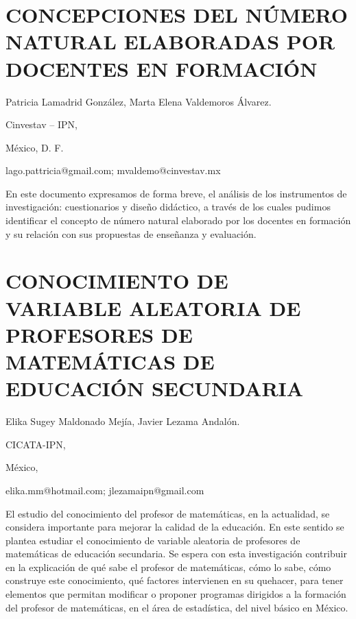 \section{CONCEPCIONES DEL NÚMERO NATURAL ELABORADAS POR DOCENTES EN FORMACIÓN}

\begin{datos}

Patricia Lamadrid González, Marta Elena Valdemoros Álvarez.

Cinvestav – IPN, 

México, D. F.

lago.pattricia@gmail.com; mvaldemo@cinvestav.mx 

\end{datos}

En este documento expresamos de forma breve, el análisis de los instrumentos
de investigación: cuestionarios y diseño didáctico, a través de los
cuales pudimos identificar el concepto de número natural elaborado
por los docentes en formación y su relación con sus propuestas de
enseñanza y evaluación.





 


\section{CONOCIMIENTO DE VARIABLE ALEATORIA DE PROFESORES DE MATEMÁTICAS DE
EDUCACIÓN SECUNDARIA}

\begin{datos}

Elika Sugey Maldonado Mejía, Javier Lezama Andalón.

CICATA-IPN,

México,

elika.mm@hotmail.com; jlezamaipn@gmail.com

\end{datos}

El estudio del conocimiento del profesor de matemáticas, en la actualidad,
se considera importante para mejorar la calidad de la educación. En
este sentido se plantea estudiar el conocimiento de variable aleatoria
de profesores de matemáticas de educación secundaria. Se espera con
esta investigación contribuir en la explicación de qué sabe el profesor
de matemáticas, cómo lo sabe, cómo construye este conocimiento, qué
factores intervienen en su quehacer, para tener elementos que permitan
modificar o proponer programas dirigidos a la formación del profesor
de matemáticas, en el área de estadística, del nivel básico en México.


